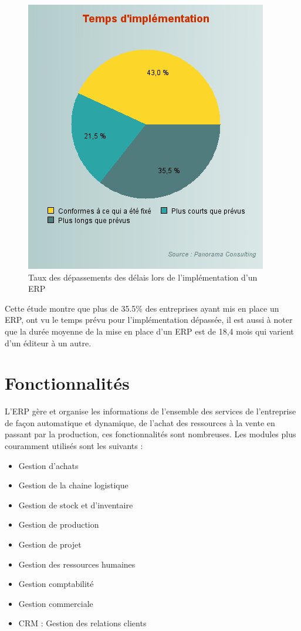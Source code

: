 \begin{figure}[H]
    \centering
    \includegraphics[scale=0.65]{ERP/graph-taux-implementation.png}
    \caption{Taux des dépassements des délais lors de l’implémentation d’un ERP}
\end{figure} 

Cette étude montre que plus de 35.5\% des entreprises ayant mis en place un ERP, ont vu le temps prévu pour l’implémentation dépassée, il est aussi à noter que la durée moyenne de la mise en place d’un ERP est de 18,4 mois qui varient d’un éditeur à un autre.

\section{Fonctionnalités}
L’ERP gère et organise les informations de l’ensemble des services de l’entreprise de façon automatique et dynamique, de l’achat des ressources à la vente en passant par la production, ces fonctionnalités sont nombreuses. Les modules plus couramment utilisés sont les suivants : \\

\begin{itemize}
    \item Gestion d’achats
    \item Gestion de la chaine logistique
    \item Gestion de stock et d’inventaire
    \item Gestion de production
    \item Gestion de projet
    \item Gestion des ressources humaines 
    \item Gestion comptabilité
    \item Gestion commerciale
    \item CRM : Gestion des relations clients\\
\end{itemize}

